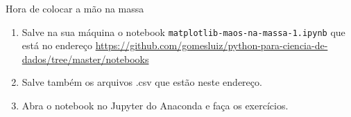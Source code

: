 \begin{frame}[t, fragile]{Hora de colocar a mão na massa}
  \begin{enumerate}
  \item Salve na sua máquina o notebook \verb!matplotlib-maos-na-massa-1.ipynb! que está no endereço \url{https://github.com/gomesluiz/python-para-ciencia-de-dados/tree/master/notebooks}
  \item Salve também os arquivos .csv que estão neste endereço.
  \item Abra o notebook no Jupyter do Anaconda e faça os exercícios.
  \end{enumerate}
\end{frame}